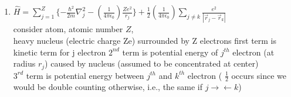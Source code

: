 \documentclass[12pt]{amsart}
\begin{document}
\begin{enumerate}
\item \underline{$\hat{H} = \sum_{j=1}^Z \{ - \frac{\hbar^2}{2m} \nabla_j^2 - ( \frac{1}{4 \pi \epsilon_0}) \frac{Z e^2}{r_j} \} + \frac{1}{2} ( \frac{1}{4 \pi \epsilon_0}) \sum_{j \neq k} \frac{e^2}{|\vec{r}_j - \vec{r}_k |}$}\\
consider atom, atomic number $Z$,\\
heavy nucleus (electric charge Ze) surrounded by Z electrons first term is kinetic term for j electron $2^{nd}$ term is potential energy of $j^{th}$ electron (at radius $r_j$) caused by nucleus (assumed to be concentrated at center)\\
$3^{rd}$ term is potential energy between $j^{th}$ and $k^{th}$ electron ( $\frac{1}{2}$ occurs since we would be double counting otherwise, i.e., the same if $j \rightarrow \leftarrow k$)\\


\hdashrule[0.5ex][c]{\linewidth}{0.5pt}{1.5mm}



\end{enumerate}
\end{document}
